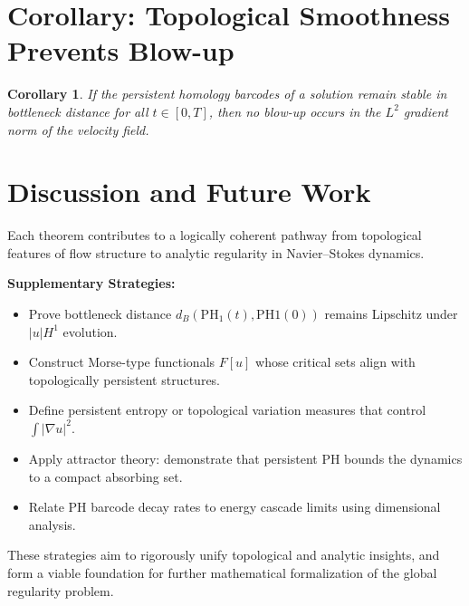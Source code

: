 \documentclass[11pt]{article}
\newtheorem{corollary}[theorem]{Corollary}
\begin{document}
\section{Corollary: Topological Smoothness Prevents Blow-up}
\begin{corollary}
If the persistent homology barcodes of a solution remain stable in bottleneck distance for all $t \in [0,T]$, then no blow-up occurs in the $L^2$ gradient norm of the velocity field.
\end{corollary}

\section*{Discussion and Future Work}
Each theorem contributes to a logically coherent pathway from topological features of flow structure to analytic regularity in Navier--Stokes dynamics.

\textbf{Supplementary Strategies:}
\begin{itemize}
\item Prove bottleneck distance $d_B(\mathrm{PH}_1(t), \mathrm{PH}1(0))$ remains Lipschitz under $|u|{H^1}$ evolution.
\item Construct Morse-type functionals $F[u]$ whose critical sets align with topologically persistent structures.
\item Define persistent entropy or topological variation measures that control $\int |\nabla u|^2$.
\item Apply attractor theory: demonstrate that persistent PH bounds the dynamics to a compact absorbing set.
\item Relate PH barcode decay rates to energy cascade limits using dimensional analysis.
\end{itemize}

These strategies aim to rigorously unify topological and analytic insights, and form a viable foundation for further mathematical formalization of the global regularity problem.
\end{document}
